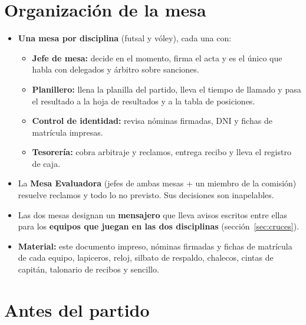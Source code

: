 \section{Organización de la mesa}
\begin{itemize}
	\item \textbf{Una mesa por disciplina} (futsal y vóley), cada una con:
	\begin{itemize}
		\item \textbf{Jefe de mesa:} decide en el momento, firma el acta y es el único que habla con delegados y árbitro sobre sanciones.
		\item \textbf{Planillero:} llena la planilla del partido, lleva el tiempo de llamado y pasa el resultado a la hoja de resultados y a la tabla de posiciones.
		\item \textbf{Control de identidad:} revisa nóminas firmadas, DNI y fichas de matrícula impresas.
		\item \textbf{Tesorería:} cobra arbitraje y reclamos, entrega recibo y lleva el registro de caja.
	\end{itemize}
	\item La \textbf{Mesa Evaluadora} (jefes de ambas mesas + un miembro de la comisión) resuelve reclamos y todo lo no previsto. Sus decisiones son inapelables.
	\item Las dos mesas designan un \textbf{mensajero} que lleva avisos escritos entre ellas para los \textbf{equipos que juegan en las dos disciplinas} (sección~\ref{sec:cruces}).
	\item \textbf{Material:} este documento impreso, nóminas firmadas y fichas de matrícula de cada equipo, lapiceros, reloj, silbato de respaldo, chalecos, cintas de capitán, talonario de recibos y sencillo.
\end{itemize}

\section{Antes del partido}


